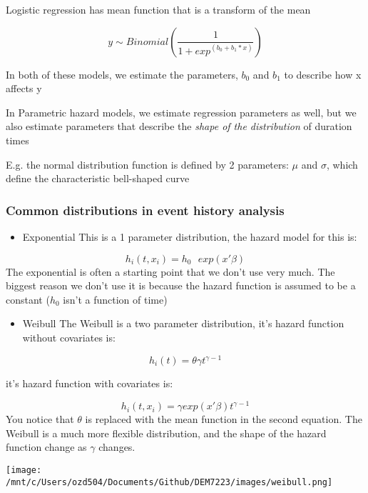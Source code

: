 \documentclass[
]{article}
\providecommand{\tightlist}{%
  \setlength{\itemsep}{0pt}\setlength{\parskip}{0pt}}
\begin{document}
Logistic regression has mean function that is a transform of the mean

\[y \sim Binomial \left ( \frac{1}{1+exp^{(b_0+b_1*x)} } \right)\]

In both of these models, we estimate the parameters, \(b_0\) and \(b_1\)
to describe how x affects y

In Parametric hazard models, we estimate regression parameters as well,
but we also estimate parameters that describe the \emph{shape of the
distribution} of duration times

E.g. the normal distribution function is defined by 2 parameters:
\(\mu\) and \(\sigma\), which define the characteristic bell-shaped
curve

\hypertarget{common-distributions-in-event-history-analysis}{%
\subsubsection{Common distributions in event history
analysis}\label{common-distributions-in-event-history-analysis}}

\begin{itemize}
\tightlist
\item
  Exponential This is a 1 parameter distribution, the hazard model for
  this is:
\end{itemize}

\[h_i(t,x_i) = h_0 \text{ } exp(x'\beta)\] The exponential is often a
starting point that we don't use very much. The biggest reason we don't
use it is because the hazard function is assumed to be a constant
(\(h_0\) isn't a function of time)

\begin{itemize}
\tightlist
\item
  Weibull The Weibull is a two parameter distribution, it's hazard
  function without covariates is:
\end{itemize}

\[h_i(t) = \theta \gamma t^{\gamma-1}\]

it's hazard function with covariates is:

\[h_i(t,x_i) = \gamma exp(x'\beta) t^{\gamma-1}\] You notice that
\(\theta\) is replaced with the mean function in the second equation.
The Weibull is a much more flexible distribution, and the shape of the
hazard function change as \(\gamma\) changes.

\texttt{[image: /mnt/c/Users/ozd504/Documents/Github/DEM7223/images/weibull.png]}
\end{document}
